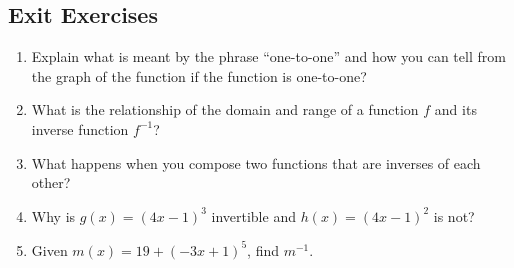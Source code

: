 \newpage

\subsection*{Exit Exercises} \label{exit-functions-inverse}



\begin{myExit}
	\begin{enumerate}
		\item Explain what is meant by the phrase ``one-to-one'' and how you can tell from the graph of the function if the function is one-to-one?
		\vfill
		\vfill
		\item What is the relationship of the domain and range of a function $f$ and its inverse function $f^{-1}$?
		\vfill
		\item What happens when you compose two functions that are inverses of each other?
		\vfill
		\item Why is $g(x)=(4x-1)^3$ invertible and $h(x)=(4x-1)^2$ is not?
		\vfill
		\item Given $m(x) = 19+(-3x+1)^5$, find $m^{-1}$.
		\vfill
		\vfill
	\end{enumerate}
\end{myExit}
\vfill








